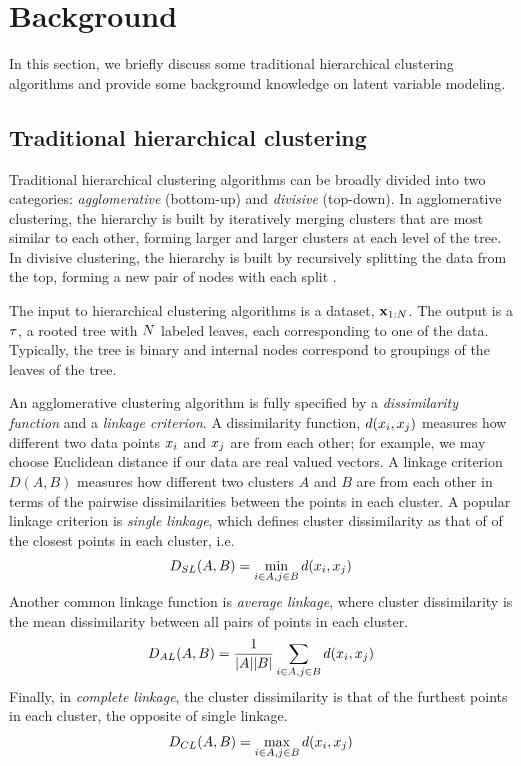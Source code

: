 \section{Background}

In this section, we briefly discuss
some traditional hierarchical clustering algorithms
and provide some
background knowledge on latent variable modeling.

\subsection{Traditional hierarchical clustering}
Traditional hierarchical clustering algorithms
can be broadly divided into two categories:
\emph{agglomerative} (bottom-up) and \emph{divisive} (top-down).
In agglomerative clustering, the hierarchy
is built by iteratively merging clusters
that are most similar to each other, forming
larger and larger clusters at each level
of the tree.
In divisive clustering,
the hierarchy is built by recursively
splitting the data from the top,
forming a new pair of nodes with 
each split \citep{Hastie2009}.

The input to hierarchical clustering algorithms
is a dataset, $\mathbf{x}_{1:N}$.
The output is a $\tau$,
a rooted tree with $N$
labeled leaves,
each corresponding to one of the data.
Typically, the tree is binary
and internal nodes correspond
to groupings of the leaves
of the tree.

An agglomerative clustering algorithm is fully specified
by a \emph{dissimilarity function} and a \emph{linkage criterion}.
A dissimilarity function,
$d(x_i, x_j)$ measures
how different two data points $x_i$ and $x_j$ are from each other;
for example, we may choose Euclidean distance 
if our data are real valued vectors.
A linkage criterion $D(A, B)$ measures how different two clusters
$A$ and $B$
are from each other in terms of the pairwise
dissimilarities between the points in each cluster.
A popular linkage criterion is
\emph{single linkage}, which defines
cluster dissimilarity
as that of
of the closest points in 
each cluster,
i.e.
\begin{align}
  D_{SL}(A, B) = \min_{i\in A, j \in B} d(x_i, x_j)
\end{align}
Another common linkage function is \emph{average linkage}, 
where cluster dissimilarity is
the mean dissimilarity between
all pairs of points in each cluster.
\begin{align}
  D_{AL}(A, B) = \frac{1}{|A||B|}\sum_{i\in A, j \in B} d(x_i, x_j)
\end{align}
Finally, in \emph{complete linkage}, the cluster
dissimilarity
is that of the furthest points in each cluster,
the opposite of single linkage.
\begin{align}
  D_{CL}(A, B) = \max_{i\in A, j \in B} d(x_i, x_j)
\end{align}

